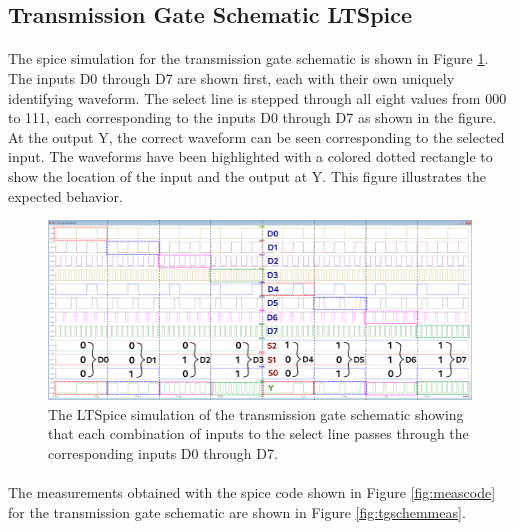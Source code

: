 \documentclass{article}
\begin{document}
  \subsection{Transmission Gate Schematic LTSpice}
    \paragraph{}
    The spice simulation for the transmission gate schematic is shown in Figure \ref{fig:tgspice}. The inputs D0 through D7 are shown first, each with their own uniquely identifying waveform. The select line is stepped through all eight values from 000 to 111, each corresponding to the inputs D0 through D7 as shown in the figure. At the output Y, the correct waveform can be seen corresponding to the selected input. The waveforms have been highlighted with a colored dotted rectangle to show the location of the input and the output at Y. This figure illustrates the expected behavior.

    \begin{figure}[H]
      \centering
      \includegraphics[width=\linewidth, frame]{screenshots/tg/schem/spice.png}
      \caption{The LTSpice simulation of the transmission gate schematic showing that each combination of inputs to the select line passes through the corresponding inputs D0 through D7.}
      \label{fig:tgspice}
    \end{figure}

    \paragraph{}
    The measurements obtained with the spice code shown in Figure \ref{fig:meascode} for the transmission gate schematic are shown in Figure \ref{fig:tgschemmeas}.
\end{document}
